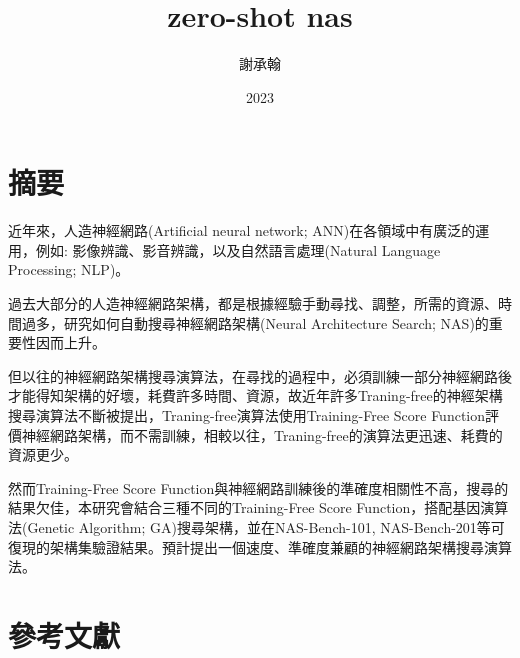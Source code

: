 \documentclass[twocolumn,10pt]{article}
\title{zero-shot nas}
\author{謝承翰}
\date{2023}
\begin{document}
\begin{CJK*}{UTF8}{bsmi}

\maketitle

\section{摘要}
近年來，人造神經網路(Artificial neural network; ANN)在各領域中有廣泛的運用，例如: 影像辨識、影音辨識，以及自然語言處理(Natural Language Processing; NLP)。\par
過去大部分的人造神經網路架構，都是根據經驗手動尋找、調整，所需的資源、時間過多，研究如何自動搜尋神經網路架構(Neural Architecture Search; NAS)的重要性因而上升。\par
但以往的神經網路架構搜尋演算法，在尋找的過程中，必須訓練一部分神經網路後才能得知架構的好壞，耗費許多時間、資源，故近年許多Traning-free的神經架構搜尋演算法不斷被提出，Traning-free演算法使用Training-Free Score Function評價神經網路架構，而不需訓練，相較以往，Traning-free的演算法更迅速、耗費的資源更少。\par
然而Training-Free Score Function與神經網路訓練後的準確度相關性不高，搜尋的結果欠佳，本研究會結合三種不同的Training-Free Score Function，搭配基因演算法(Genetic Algorithm; GA)搜尋架構，並在NAS-Bench-101, NAS-Bench-201等可復現的架構集驗證結果。預計提出一個速度、準確度兼顧的神經網路架構搜尋演算法。\par

\section{參考文獻}
\begin{thebibliography}{9}
\end{thebibliography}


\end{CJK*}
\end{document}
